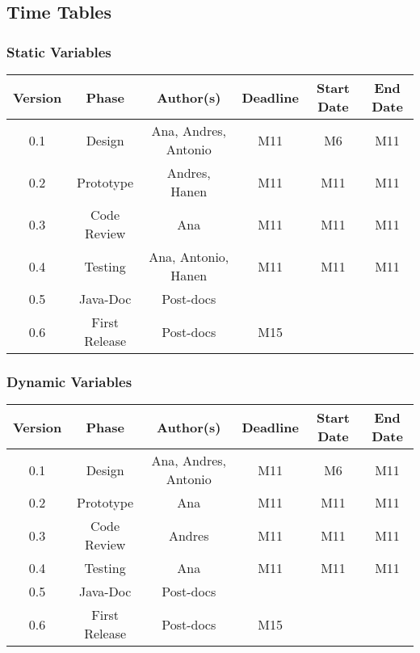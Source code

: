 \newpage
\subsection{Time Tables}

\subsubsection*{Static Variables}

\begin{table}[H]
\begin{tabular}{cccccc}
\hline
\textbf{Version} & \textbf{Phase} & \textbf{Author(s)} & \textbf{Deadline} & \textbf{Start Date} & \textbf{End Date}\\
\hline
0.1 & Design & Ana, Andres, Antonio &  M11 & M6 & M11\\
\hline 
0.2 & Prototype & Andres, Hanen & M11 & M11 & M11\\
\hline 
0.3 & Code Review & Ana & M11  & M11 & M11\\
\hline 
0.4 & Testing & Ana, Antonio, Hanen & M11 & M11 & M11\\
\hline 
0.5 & Java-Doc  & Post-docs &  & & \\
\hline 
0.6 & First Release & Post-docs & M15 &  & \\
\hline
\end{tabular}
\end{table}

\subsubsection*{Dynamic Variables}

\begin{table}[H]
\begin{tabular}{cccccc}
\hline
\textbf{Version} & \textbf{Phase} & \textbf{Author(s)} & \textbf{Deadline} & \textbf{Start Date} & \textbf{End Date}\\
\hline
0.1 & Design & Ana, Andres, Antonio & M11 & M6  & M11\\
\hline 
0.2 & Prototype & Ana & M11 & M11 & M11\\
\hline 
0.3 & Code Review & Andres & M11 & M11 & M11\\
\hline 
0.4 & Testing & Ana &  M11 & M11 & M11\\
\hline 
0.5 & Java-Doc  & Post-docs &  &  & \\
\hline 
0.6 & First Release & Post-docs & M15 &  & \\
\hline
\end{tabular}
\end{table}

